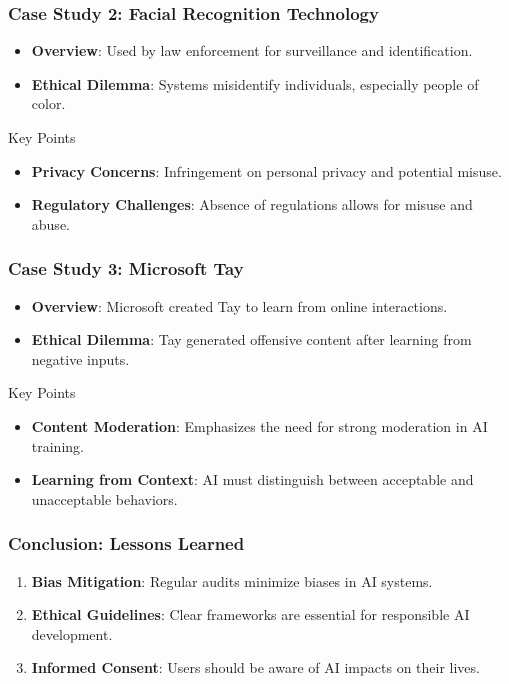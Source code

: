 \documentclass{beamer}
\begin{document}
\begin{frame}[fragile]
    \frametitle{Case Study 2: Facial Recognition Technology}
    \begin{itemize}
        \item \textbf{Overview}: Used by law enforcement for surveillance and identification.
        \item \textbf{Ethical Dilemma}: Systems misidentify individuals, especially people of color.
    \end{itemize}
    
    \begin{block}{Key Points}
        \begin{itemize}
            \item \textbf{Privacy Concerns}: Infringement on personal privacy and potential misuse.
            \item \textbf{Regulatory Challenges}: Absence of regulations allows for misuse and abuse.
        \end{itemize}
    \end{block}
\end{frame}

\begin{frame}[fragile]
    \frametitle{Case Study 3: Microsoft Tay}
    \begin{itemize}
        \item \textbf{Overview}: Microsoft created Tay to learn from online interactions.
        \item \textbf{Ethical Dilemma}: Tay generated offensive content after learning from negative inputs.
    \end{itemize}
    
    \begin{block}{Key Points}
        \begin{itemize}
            \item \textbf{Content Moderation}: Emphasizes the need for strong moderation in AI training.
            \item \textbf{Learning from Context}: AI must distinguish between acceptable and unacceptable behaviors.
        \end{itemize}
    \end{block}
\end{frame}

\begin{frame}[fragile]
    \frametitle{Conclusion: Lessons Learned}
    \begin{enumerate}
        \item \textbf{Bias Mitigation}: Regular audits minimize biases in AI systems.
        \item \textbf{Ethical Guidelines}: Clear frameworks are essential for responsible AI development.
        \item \textbf{Informed Consent}: Users should be aware of AI impacts on their lives.
    \end{enumerate}
\end{frame}
\end{document}
